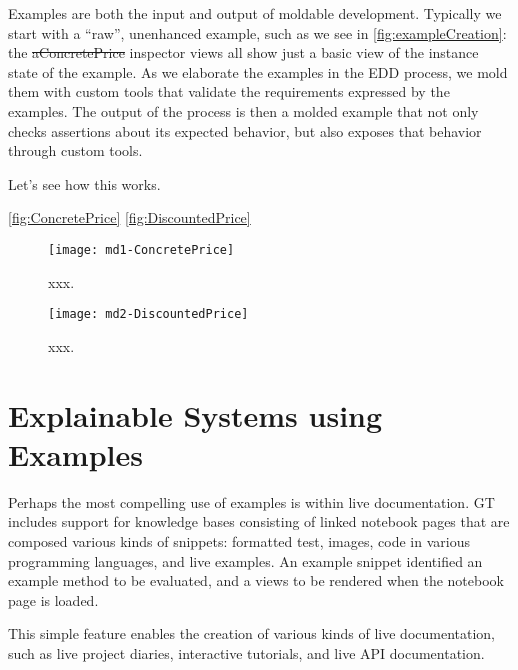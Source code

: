 \documentclass[sigplan,anonymous,review,10pt]{acmart}
\begin{document}
Examples are both the input and output of moldable development.
Typically we start with a ``raw'', unenhanced example, such as we see in \autoref{fig:exampleCreation}: the \st{aConcretePrice} inspector views all show just a basic view of the instance state of the example.
As we elaborate the examples in the EDD process, we mold them with custom tools that validate the requirements expressed by the examples.
The output of the process is then a molded example that not only checks assertions about its expected behavior, but also exposes that behavior through custom tools.

Let's see how this works.

\autoref{fig:ConcretePrice}
\autoref{fig:DiscountedPrice}


\begin{figure}[h]
  \texttt{[image: md1-ConcretePrice]}
  \caption{xxx.}
  \label{fig:ConcretePrice}
\end{figure}




\begin{figure}[h]
  \texttt{[image: md2-DiscountedPrice]}
  \caption{xxx.}
  \label{fig:DiscountedPrice}
\end{figure}





\section{Explainable Systems using Examples}\label{sec:explainable}


Perhaps the most compelling use of examples is within live documentation.
GT includes support for knowledge bases consisting of linked notebook pages that are composed various kinds of snippets: formatted test, images, code in various programming languages, and live examples.
An example snippet identified an example method to be evaluated, and a views to be rendered when the notebook page is loaded.

This simple feature enables the creation of various kinds of live documentation, such as live project diaries, interactive tutorials, and live API documentation.
\end{document}
